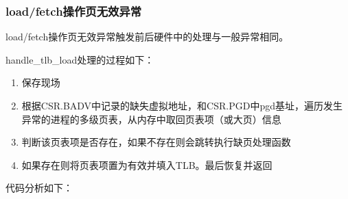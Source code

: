 \subsubsection{load/fetch操作页无效异常}\label{sec:10-mmu-006}

load/fetch操作页无效异常触发前后硬件中的处理与一般异常相同。

handle\_tlb\_load处理的过程如下：

\begin{enumerate}
\def\labelenumi{\arabic{enumi}.}
\tightlist
\item
  保存现场
\item
  根据CSR.BADV中记录的缺失虚拟地址，和CSR.PGD中pgd基址，遍历发生异常的进程的多级页表，从内存中取回页表项（或大页）信息
\item
  判断该页表项是否存在，如果不存在则会跳转执行缺页处理函数
\item
  如果存在则将页表项置为有效并填入TLB。最后恢复并返回
\end{enumerate}

代码分析如下：

